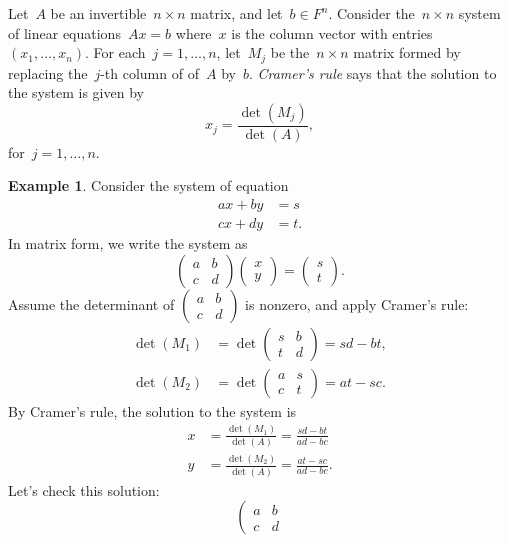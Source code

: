 \documentclass[11pt,twoside]{amsart}
\theoremstyle{plain}
\theoremstyle{remark}
\theoremstyle{definition}
\newtheorem{ex}[prop]{Example}
\theoremstyle{definition}
\begin{document}
Let~$A$ be an invertible~$n\times n$ matrix, and let~$b\in F^n$.  Consider
the~$n\times n$ system of linear equations~$Ax=b$ where~$x$ is the column vector
with entries~$(x_1,\dots,x_n)$.  For each~$j=1,\dots,n$, 
let~$M_j$ be the~$n\times n$ matrix formed by replacing the~$j$-th column of
of~$A$ by~$b$.  {\em Cramer's rule} says that the solution to the system is
given by
\[
  x_j=\frac{\det(M_j)}{\det(A)},
\]
for~$j=1,\dots,n$.

\begin{ex}
Consider the system of equation
\begin{align*}
  ax+by&=s\\
  cx+dy&=t.
\end{align*}
In matrix form, we write the system as
\[
  \left(\begin{array}{cc}
      a&b\\c&d
  \end{array} \right)
  \left(\begin{array}{c}
      x\\y
  \end{array} \right)
  =
  \left(\begin{array}{c}
      s\\t
  \end{array} \right).
\]
Assume the determinant of $\left(\begin{array}{cc}
    a&b\\c&d
\end{array} \right)$ is nonzero, and apply Cramer's rule:
\begin{align*}
  \det(M_1) 
  &= \det\left(\begin{array}{cc}
      s&b\\
      t&d
  \end{array} \right)=sd-bt,\\[12pt]
  \det(M_2)
  &= \det\left(\begin{array}{cc}
      a&s\\
      c&t
  \end{array} \right)=at-sc.
\end{align*}
By Cramer's rule, the solution to the system is
\begin{align*}
  x&=\frac{\det(M_1)}{\det(A)}=\frac{sd-bt}{ad-bc}\\[12pt]
  y&=\frac{\det(M_2)}{\det(A)}=\frac{at-sc}{ad-bc}.
\end{align*}
Let's check this solution:
\[
  \left(\begin{array}{cc}
      a&b\\c&d

\end{array}\]
\end{ex}
\end{document}
